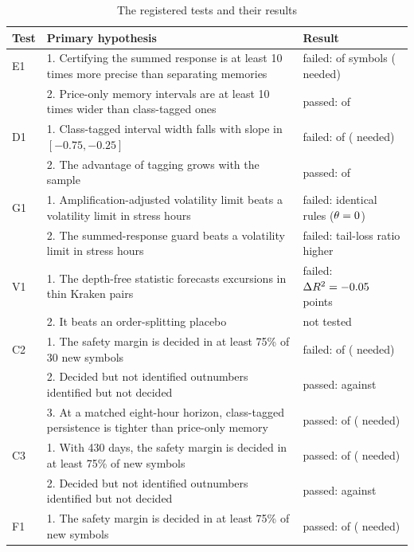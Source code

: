 \begin{table}[ht]\centering\small
\begin{threeparttable}
\caption{The registered tests and their results}\label{tab:registered}
\begin{tabular}{p{}p{}p{}}
\toprule
Test & Primary hypothesis & Result\\
\midrule
E1 & 1. Certifying the summed response is at least 10 times more precise than separating memories & failed: \EonePone{} of \EoneSymbols{} symbols (\EoneNeed{} needed)\\
 & 2. Price-only memory intervals are at least 10 times wider than class-tagged ones & passed: \EonePtwo{} of \EoneSymbols{}\\
D1 & 1. Class-tagged interval width falls with slope in $[-0.75,-0.25]$ & failed: \DonePone{} of \DoneSymbols{} (\DoneNeed{} needed)\\
 & 2. The advantage of tagging grows with the sample & passed: \DonePtwo{} of \DoneSymbols{}\\
G1 & 1. Amplification-adjusted volatility limit beats a volatility limit in stress hours & failed: identical rules ($\theta=0$)\\
 & 2. The summed-response guard beats a volatility limit in stress hours & failed: tail-loss ratio \GoneGuardPct{} higher\\
V1 & 1. The depth-free statistic forecasts excursions in thin Kraken pairs & failed: $\Delta R^2=-0.05$ points\\
 & 2. It beats an order-splitting placebo & not tested\\
C2 & 1. The safety margin is decided in at least 75\% of 30 new symbols & failed: \CtwoDecided{} of \CtwoSymbols{} (\CtwoNeed{} needed)\\
 & 2. Decided but not identified outnumbers identified but not decided & passed: \CtwoB{} against \CtwoC{}\\
 & 3. At a matched eight-hour horizon, class-tagged persistence is tighter than price-only memory & passed: \CtwoPthreeTighter{} of \CtwoPthreeSymbols{} (\CtwoPthreeNeed{} needed)\\
C3 & 1. With 430 days, the safety margin is decided in at least 75\% of new symbols & passed: \CthreeDecided{} of \CthreeSymbols{} (\CthreeNeed{} needed)\\
 & 2. Decided but not identified outnumbers identified but not decided & passed: \CthreeB{} against \CthreeC{}\\
F1 & 1. The safety margin is decided in at least 75\% of new symbols & passed: \FoneDecided{} of \FoneSymbols{} (\FoneNeed{} needed)\\

\end{tabular}
\end{threeparttable}
\end{table}
